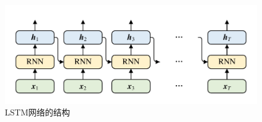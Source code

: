 \begin{figure}[htb]
	\centering
	\includegraphics[page=4, width=0.85\linewidth]{images/structure.pdf}
	\caption{LSTM网络的结构}
	\label{fig:LSTM}
\end{figure}
